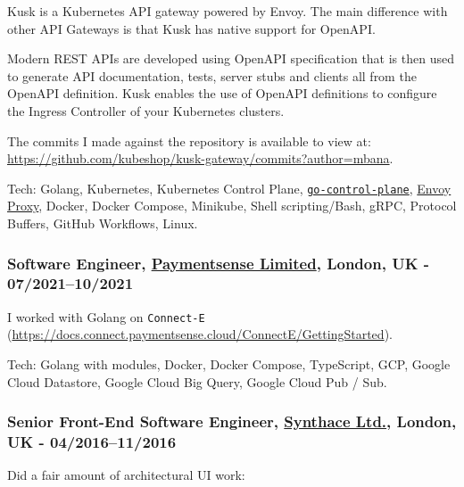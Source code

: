 \documentclass[
  a4paper,
]{article}
\begin{document}
Kusk is a Kubernetes API gateway powered by Envoy. The main difference
with other API Gateways is that Kusk has native support for OpenAPI.

Modern REST APIs are developed using OpenAPI specification that is then
used to generate API documentation, tests, server stubs and clients all
from the OpenAPI definition. Kusk enables the use of OpenAPI definitions
to configure the Ingress Controller of your Kubernetes clusters.

The commits I made against the repository is available to view at:
\url{https://github.com/kubeshop/kusk-gateway/commits?author=mbana}.

Tech: Golang, Kubernetes, Kubernetes Control Plane,
\href{https://github.com/envoyproxy/go-control-plane}{\texttt{go-control-plane}},
\href{https://www.envoyproxy.io/}{Envoy Proxy}, Docker, Docker Compose,
Minikube, Shell scripting/Bash, gRPC, Protocol Buffers, GitHub
Workflows, Linux.

\hypertarget{software-engineer-paymentsense-limited-london-uk---072021102021}{%
\subsubsection{\texorpdfstring{Software Engineer,
\href{https://www.paymentsense.com}{Paymentsense Limited}, London, UK -
07/2021--10/2021}{Software Engineer, Paymentsense Limited, London, UK - 07/2021--10/2021}}\label{software-engineer-paymentsense-limited-london-uk---072021102021}}

I worked with Golang on \texttt{Connect-E}
(\url{https://docs.connect.paymentsense.cloud/ConnectE/GettingStarted}).

Tech: Golang with modules, Docker, Docker Compose, TypeScript, GCP,
Google Cloud Datastore, Google Cloud Big Query, Google Cloud Pub / Sub.

\hypertarget{senior-front-end-software-engineer-synthace-ltd.-london-uk---042016112016}{%
\subsubsection{\texorpdfstring{Senior Front-End Software Engineer,
\href{https://synthace.com}{Synthace Ltd.}, London, UK -
04/2016--11/2016}{Senior Front-End Software Engineer, Synthace Ltd., London, UK - 04/2016--11/2016}}\label{senior-front-end-software-engineer-synthace-ltd.-london-uk---042016112016}}

Did a fair amount of architectural UI work:
\end{document}
